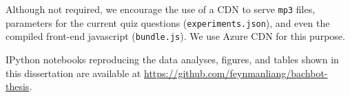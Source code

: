 Although not required, we encourage the use of a CDN to serve \texttt{mp3}
files, parameters for the current quiz questions (\texttt{experiments.json}),
and even the compiled front-end javascript (\texttt{bundle.js}). We use Azure
CDN for this purpose.

IPython notebooks reproducing the data analyses, figures, and tables shown in this
dissertation are available at
\url{https://github.com/feynmanliang/bachbot-thesis}.
